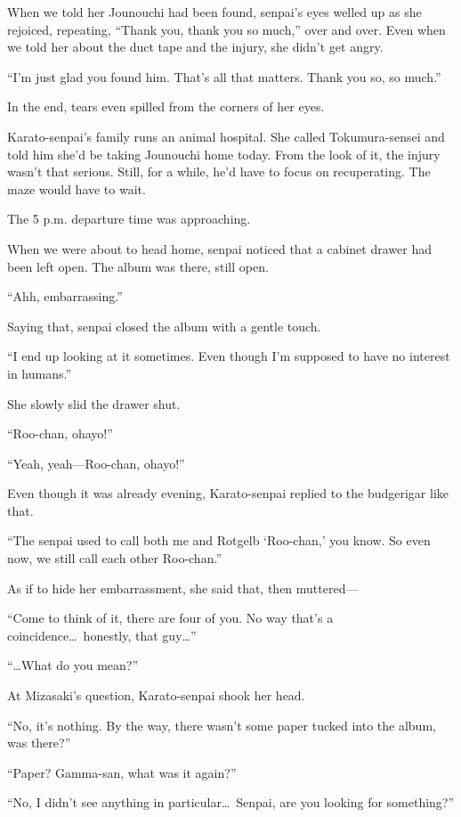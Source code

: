 \documentclass[
    a4paper,
    12pt,
    twoside,
    openany,
    UTF8,
    fontset=windows
]{ctexbook}
\begin{document}
When we told her Jounouchi had been found, senpai's eyes welled up as she rejoiced, repeating, ``Thank you, thank you so much,'' over and over. Even when we told her about the duct tape and the injury, she didn't get angry.

``I'm just glad you found him. That's all that matters. Thank you so, so much.''

In the end, tears even spilled from the corners of her eyes.

Karato-senpai's family runs an animal hospital. She called Tokumura-sensei and told him she'd be taking Jounouchi home today. From the look of it, the injury wasn't that serious. Still, for a while, he'd have to focus on recuperating. The maze would have to wait.

The 5 p.m. departure time was approaching.

When we were about to head home, senpai noticed that a cabinet drawer had been left open. The album was there, still open.

``Ahh, embarrassing.''

Saying that, senpai closed the album with a gentle touch.

``I end up looking at it sometimes. Even though I'm supposed to have no interest in humans.''

She slowly slid the drawer shut.

``Roo-chan, ohayo!''

``Yeah, yeah---Roo-chan, ohayo!''

Even though it was already evening, Karato-senpai replied to the budgerigar like that.

``The senpai used to call both me and Rotgelb `Roo-chan,' you know. So even now, we still call each other Roo-chan.''

As if to hide her embarrassment, she said that, then muttered---

``Come to think of it, there are four of you. No way that's a coincidence\dots\ honestly, that guy\dots''

``\dots What do you mean?''

At Mizasaki's question, Karato-senpai shook her head.

``No, it's nothing. By the way, there wasn't some paper tucked into the album, was there?''

``Paper? Gamma-san, what was it again?''

``No, I didn't see anything in particular\dots\ Senpai, are you looking for something?''
\end{document}
